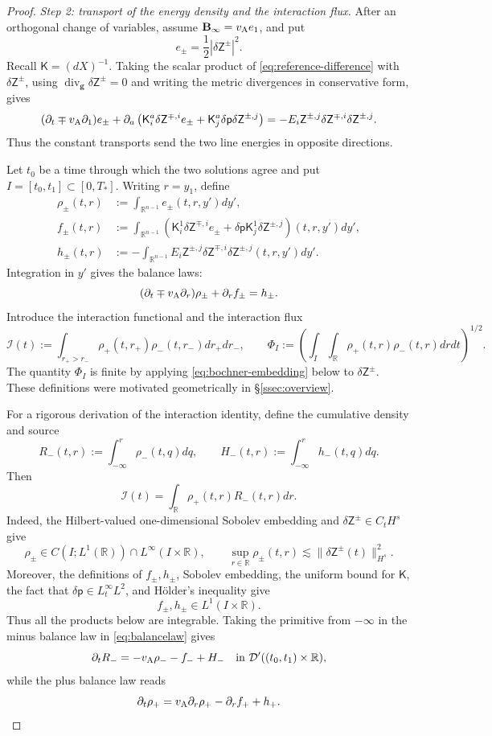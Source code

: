 \documentclass[11pt,reqno]{amsart}
\theoremstyle{plain}
\theoremstyle{definition}
\theoremstyle{remark}
\numberwithin{equation}{section}
\DeclareMathOperator{\Div}{div}
\newcommand{\Kmat}{\mathsf K}
\newcommand{\gmetric}{\mathbf g}
\newcommand{\Binf}{\mathbf B_\infty}
\newcommand{\Real}{\mathbb R}
\begin{document}
\begin{proof}
\emph{Step 2: transport of the energy density and the interaction flux.}
After an orthogonal change of variables, assume $\Binf=v_{\rm A}e_1$, and put
\[
    e_\pm=\frac12 |\delta\mathsf Z^\pm|^2.
\]
Recall $\Kmat=(dX)^{-1}$.  Taking the scalar product of
\eqref{eq:reference-difference} with
$\delta\mathsf Z^\pm$, using
$\Div_{\gmetric}\delta\mathsf Z^\pm=0$ and writing the metric
divergences in conservative form, gives
\[
 (\partial_t\mp v_{\rm A}\partial_1)e_\pm
 +\partial_a\left(
   \Kmat_i^a\delta\mathsf Z^{\mp,i}e_\pm
   +\Kmat_j^a\delta\mathsf p \delta\mathsf Z^{\pm,j}\right)
 =-E_i\mathsf Z^{\pm,j}
   \delta\mathsf Z^{\mp,i}\delta\mathsf Z^{\pm,j}.
\]
Thus the constant transports send the two line energies in opposite
directions.

Let $t_0$ be a time through which the two solutions agree and put
$I=[t_0,t_1]\subset[0,T_*]$.  Writing $r=y_1$, define
\[
\begin{aligned}
 \rho_\pm(t,r)
 &:=\int_{\Real^{n-1}}e_\pm(t,r,y') dy',\\
 f_\pm(t,r)
 &:=\int_{\Real^{n-1}}
   \left(\Kmat_i^1\delta\mathsf Z^{\mp,i}e_\pm
   +\delta\mathsf p \Kmat_j^1\delta\mathsf Z^{\pm,j}\right)
   (t,r,y') dy',\\
 h_\pm(t,r)
 &:=-\int_{\Real^{n-1}}
   E_i\mathsf Z^{\pm,j}
   \delta\mathsf Z^{\mp,i}\delta\mathsf Z^{\pm,j}
   (t,r,y') dy'.
\end{aligned}
\]
Integration in $y'$ gives the balance laws:
\begin{equation}\label{eq:balancelaw}
    (\partial_t\mp v_{\rm A}\partial_r)\rho_\pm
 +\partial_rf_\pm=h_\pm.
\end{equation}
Introduce the interaction functional and the interaction flux
\[
 \mathscr I(t):=\int_{r_+>r_-}
 \rho_+(t,r_+)\rho_-(t,r_-) dr_+ dr_-,
 \qquad
 \Phi_I:=\left(
 \int_I\int_{\Real}\rho_+(t,r)\rho_-(t,r) dr dt\right)^{1/2}.
\]
The quantity $\Phi_I$ is finite by applying
\eqref{eq:bochner-embedding} below to $\delta\mathsf Z^\pm$.  These definitions were motivated geometrically in \S\ref{ssec:overview}.

For a rigorous derivation of the interaction identity, define the cumulative
density and source
\[
 R_-(t,r):=\int_{-\infty}^r\rho_-(t,q)dq,
 \qquad
 H_-(t,r):=\int_{-\infty}^rh_-(t,q)dq.
\]
Then
\[
 \mathscr I(t)=\int_{\Real}\rho_+(t,r)R_-(t,r)dr.
\]
Indeed, the Hilbert-valued one-dimensional Sobolev embedding and
$\delta\mathsf Z^\pm\in C_tH^s$ give
\[
 \rho_\pm\in C(I;L^1(\Real))\cap L^\infty(I\times\Real),
 \qquad
 \sup_{r\in\Real}\rho_\pm(t,r)
 \lesssim\|\delta\mathsf Z^\pm(t)\|_{H^s}^2.
\]
Moreover, the definitions of $f_\pm,h_\pm$, Sobolev embedding, the uniform
bound for $\Kmat$, the fact that $\delta\mathsf p\in L^\infty_tL^2$, and H\"older's
inequality give
\[
 f_\pm,h_\pm\in L^1(I\times\Real).
\]
Thus all the products below are integrable. Taking the primitive from
$-\infty$ in the minus balance law in \eqref{eq:balancelaw} gives
\[
 \partial_tR_-=-v_{\rm A}\rho_--f_-+H_-
 \quad\text{in }\mathcal D'((t_0,t_1)\times\Real),
\]
while the plus balance law reads
\[
 \partial_t\rho_+
 =v_{\rm A}\partial_r\rho_+-\partial_rf_++h_+.
\]


\end{proof}
\end{document}
